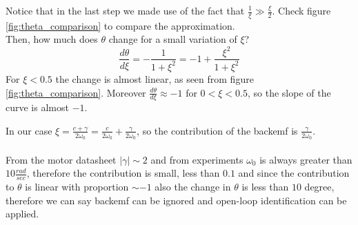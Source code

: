Notice that in the last step we made use of the fact that $\frac{1}{\xi} \gg \frac{\xi}{2}$. Check figure \ref{fig:theta_comparison} to compare the approximation. \\ 
Then, how much does $\theta$ change for a small variation of $\xi$?
$$\frac{d\theta}{d\xi} = -\frac{1}{1+\xi^2} = -1 + \frac{\xi^2}{1+\xi^2}$$
For $\xi < 0.5$ the change is almost linear, as seen from figure \ref{fig:theta_comparison}. Moreover $\frac{d\theta}{d\xi} \approx -1$ for $0 < \xi < 0.5$, so the slope of the curve is almost $-1$.

In our case $\xi = \frac{c+\gamma}{2\omega_0}= \frac{c}{2\omega_0}+ \frac{\gamma}{2\omega_0}$, so the contribution of the backemf is $\frac{\gamma}{2\omega_0}$. \\ \\
From the motor datasheet $| \gamma | \sim 2$ and from experiments $\omega_0$ is always greater than $10 \frac{rad}{sec}$, therefore the contribution is small, less than $0.1$ and since the contribution to $\theta$ is linear with proportion $\sim -1$ also the change in $\theta$ is less than $10$ degree, therefore we can say backemf can be ignored and open-loop identification can be applied.

